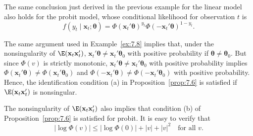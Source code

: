 \begin{example}
\label{ex:7.9}
The same conclusion just derived in the previous example for the linear model also holds for the probit model, whose conditional likelihood for observation $t$ is
\[
f(y_t \mid \mathbf{x}_t; \bm{\theta}) = \Phi(\mathbf{x}_t' \bm{\theta})^{y_t} \Phi(-\mathbf{x}_t' \bm{\theta})^{1-y_t}.
\]

The same argument used in Example~\ref{ex:7.8} implies that, under the nonsingularity of $\E(\mathbf{x}_t \mathbf{x}_t')$, $\mathbf{x}_t' \bm{\theta} \neq \mathbf{x}_t' \bm{\theta}_0$ with positive probability if $\bm{\theta} \neq \bm{\theta}_0$. But since $\Phi(v)$ is strictly monotonic, $\mathbf{x}_t' \bm{\theta} \neq \mathbf{x}_t' \bm{\theta}_0$ with positive probability implies $\Phi(\mathbf{x}_t' \bm{\theta}) \neq \Phi(\mathbf{x}_t' \bm{\theta}_0)$ and $\Phi(-\mathbf{x}_t' \bm{\theta}) \neq \Phi(-\mathbf{x}_t' \bm{\theta}_0)$ with positive probability. Hence, the identification condition (a) in Proposition~\ref{prop:7.6} is satisfied if $\E(\mathbf{x}_t \mathbf{x}_t')$ is nonsingular.

The nonsingularity of $\E(\mathbf{x}_t \mathbf{x}_t')$ also implies that condition (b) of Proposition~\ref{prop:7.6} is satisfied for probit. It is easy to verify that
\begin{equation}
\label{eq:7.2.14}
|\log \Phi(v)| \leq |\log \Phi(0)| + |v| + |v|^2 \quad \text{for all } v.
\end{equation}


\end{example}
